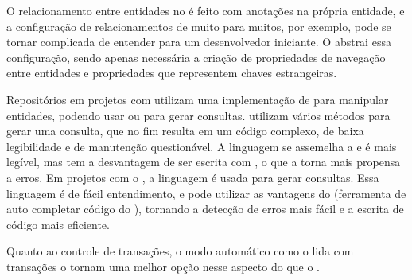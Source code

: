 O relacionamento entre entidades no  é feito com anotações na própria entidade, e a configuração de relacionamentos de muito para muitos, por exemplo, pode se tornar complicada de entender para um desenvolvedor iniciante. O  abstrai essa configuração, sendo apenas necessária a criação de propriedades de navegação entre entidades e propriedades que representem chaves estrangeiras.

Repositórios em projetos  com  utilizam uma implementação de  para manipular entidades, podendo usar  ou  para gerar consultas.  utilizam vários métodos para gerar uma consulta, que no fim resulta em um código complexo, de baixa legibilidade e de manutenção questionável. A linguagem  se assemelha a  e é mais legível, mas tem a desvantagem de ser escrita com , o que a torna mais propensa a erros. Em projetos com o , a linguagem  é usada para gerar consultas. Essa linguagem é de fácil entendimento, e pode utilizar as vantagens do  (ferramenta de auto completar código do ), tornando a detecção de erros mais fácil e a escrita de código mais eficiente.

Quanto ao controle de transações, o modo automático como o  lida com transações o tornam uma melhor opção nesse aspecto do que o . 